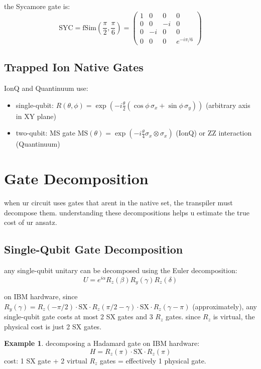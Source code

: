 \documentclass[11pt,a4paper]{article}
\theoremstyle{definition}
\newtheorem{example}{Example}[section]
\theoremstyle{remark}
\begin{document}
the Sycamore gate is:
\[
\text{SYC} = \text{fSim}\left(\frac{\pi}{2}, \frac{\pi}{6}\right) = \begin{pmatrix} 1 & 0 & 0 & 0 \\ 0 & 0 & -i & 0 \\ 0 & -i & 0 & 0 \\ 0 & 0 & 0 & e^{-i\pi/6} \end{pmatrix}
\]

\subsection{Trapped Ion Native Gates}

IonQ and Quantinuum use:
\begin{itemize}[leftmargin=*]
    \item single-qubit: $R(\theta, \phi) = \exp\left(-i\frac{\theta}{2}(\cos\phi \, \sigma_x + \sin\phi \, \sigma_y)\right)$ (arbitrary axis in XY plane)
    \item two-qubit: MS gate $\text{MS}(\theta) = \exp\left(-i\frac{\theta}{4}\sigma_x \otimes \sigma_x\right)$ (IonQ) or ZZ interaction (Quantinuum)
\end{itemize}

\section{Gate Decomposition}

when ur circuit uses gates that arent in the native set, the transpiler must decompose them. understanding these decompositions helps u estimate the true cost of ur ansatz.

\subsection{Single-Qubit Gate Decomposition}

any single-qubit unitary can be decomposed using the Euler decomposition:
\[
U = e^{i\alpha} R_z(\beta) R_y(\gamma) R_z(\delta)
\]

on IBM hardware, since $R_y(\gamma) = R_z(-\pi/2) \cdot \text{SX} \cdot R_z(\pi/2 - \gamma) \cdot \text{SX} \cdot R_z(\gamma - \pi)$ (approximately), any single-qubit gate costs at most 2 SX gates and 3 $R_z$ gates. since $R_z$ is virtual, the physical cost is just 2 SX gates.

\begin{example}
decomposing a Hadamard gate on IBM hardware:
\[
H = R_z(\pi) \cdot \text{SX} \cdot R_z(\pi)
\]
cost: 1 SX gate + 2 virtual $R_z$ gates = effectively 1 physical gate.
\end{example}
\end{document}
